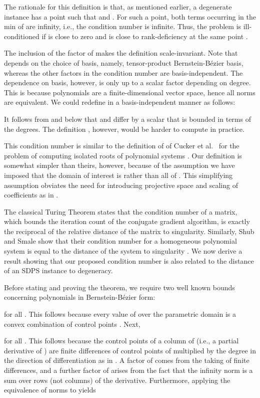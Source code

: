 \documentclass{article}
\newcommand\eref[1]{}
\begin{document}
The rationale for this definition is that, as mentioned earlier,
a degenerate instance has a point  such that  and
.  For such a point, both terms occurring in the min
of \eref{cond_def}
are infinity, i.e., the condition number is infinite.  Thus, the
problem is ill-conditioned
if  is close to zero and  is close
to rank-deficiency at the same point .


The inclusion of the factor
of  makes the definition scale-invariant.  Note that  depends
on the choice of basis, namely, tensor-product Bernstein-B\'ezier basis,
whereas the other factors in the condition number
are basis-independent.  The dependence on
basis, however, is only up to a scalar factor depending
on degree.  This is because polynomials are a finite-dimensional vector
space, hence all norms are equivalent.  We could redefine  in a 
basis-independent manner as follows:

It follows from \eref{eq:fMbound} and \eref{theta_eq}
below that  and  differ by a scalar
that is bounded in terms of the degrees.
The definition , however, 
would be harder to compute
in practice.

This condition number is similar to the definition of
  of Cucker et al.\ \cite{Cuckeretal} 
for the problem of computing isolated roots of polynomial
systems .
Our definition is somewhat simpler than theirs, however,
because
of the assumption we have imposed
that the domain of interest
is  rather than all of .  This simplifying
assumption obviates the need for introducing projective
space and scaling of coefficients as in \cite{Cuckeretal}.

The classical Turing Theorem \cite{Chaitin} states that the condition
number of a matrix, which bounds the iteration count of the conjugate
gradient algorithm, is exactly the reciprocal of the relative distance
of the matrix to singularity.  Similarly, Shub and Smale show that
their condition number for a homogeneous polynomial system is equal to
the distance of the system to singularity \cite{shub}.  We now derive
a result showing that our proposed condition number is also related
to
the distance of an SDPS instance to degeneracy.

Before stating and proving the theorem, we
require two well known bounds concerning polynomials 
in Bernstein-B\'ezier form:

for all .
This follows because every value of  over the
parametric domain is a convex combination
of control points \cite{Farin}.
Next, 

for all .
This follows because
the control points of a column of  (i.e., a partial derivative of )
are finite differences of control points
of  multiplied by the degree in the direction of differentiation
as in \eref{eq:bezderiv1}.  A
factor of  comes from the taking of finite differences, and a further
factor of  arises from the fact that the infinity norm is a sum
over rows (not columns) of the derivative.  Furthermore, applying the equivalence of norms to \eref{eq:fpMbound} yields
\end{document}
